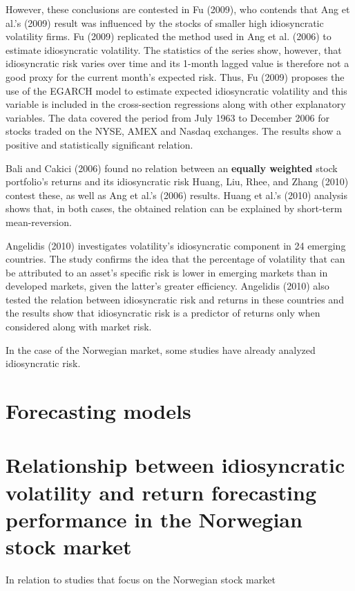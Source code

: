 However, these conclusions are contested in Fu (2009), who contends that Ang et al.'s (2009) result was influenced by the stocks of smaller high idiosyncratic volatility firms. Fu (2009) replicated the method used in Ang et al. (2006) to estimate idiosyncratic volatility. The statistics of the series show, however, that idiosyncratic risk varies over time and its 1-month lagged value is therefore not a good proxy for the current month's expected risk. Thus, Fu (2009) proposes the use of the EGARCH model to estimate expected idiosyncratic volatility and this variable is included in the cross-section regressions along with other explanatory variables. The data covered the period from July 1963 to December 2006 for stocks traded on the NYSE, AMEX and Nasdaq exchanges. The results show a positive and statistically significant relation.

Bali and Cakici (2006) found no relation between an \textbf{equally weighted} stock portfolio's returns and its idiosyncratic risk Huang, Liu, Rhee, and Zhang (2010) contest these, as well as Ang et al.'s (2006) results. Huang et al.'s (2010) analysis shows that, in both cases, the obtained relation can be explained by short-term mean-reversion.

Angelidis (2010) investigates volatility's idiosyncratic component in 24 emerging countries. The study confirms the idea that the percentage of volatility that can be attributed to an asset's specific risk is lower in emerging markets than in developed markets, given the latter's greater efficiency. Angelidis (2010) also tested the relation between idiosyncratic risk and returns in these countries and the results show that idiosyncratic risk is a predictor of returns only when considered along with market risk.

In the case of the Norwegian market, some studies have already analyzed idiosyncratic risk.

\section*{Forecasting models}


\section*{Relationship between idiosyncratic volatility and return forecasting performance in the Norwegian stock market}

In relation to studies that focus on the Norwegian stock market